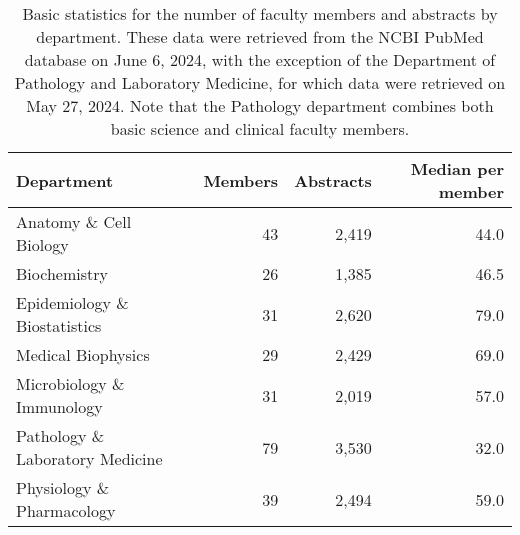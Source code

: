\documentclass[12pt]{article}
\begin{document}

\begin{table}[hbtp]
\centering
\begin{tabular}{lrrr}
Department & Members & Abstracts & Median per member\\
\hline
Anatomy \& Cell Biology & 43 & 2,419 & 44.0\\
Biochemistry & 26 & 1,385 & 46.5\\
Epidemiology \& Biostatistics & 31 & 2,620 & 79.0\\
Medical Biophysics & 29 & 2,429 & 69.0\\
Microbiology \& Immunology & 31 & 2,019 & 57.0\\
Pathology \& Laboratory Medicine & 79 & 3,530 & 32.0\\
Physiology \& Pharmacology & 39 & 2,494 & 59.0\\
\hline
\end{tabular}
\caption{
Basic statistics for the number of faculty members and abstracts by department.
These data were retrieved from the NCBI PubMed database on June 6, 2024, with the exception of the Department of Pathology and Laboratory Medicine, for which data were retrieved on May 27, 2024.
Note that the Pathology department combines both basic science and clinical faculty members.
}
\label{tab:faculty}
\end{table}
\end{document}
